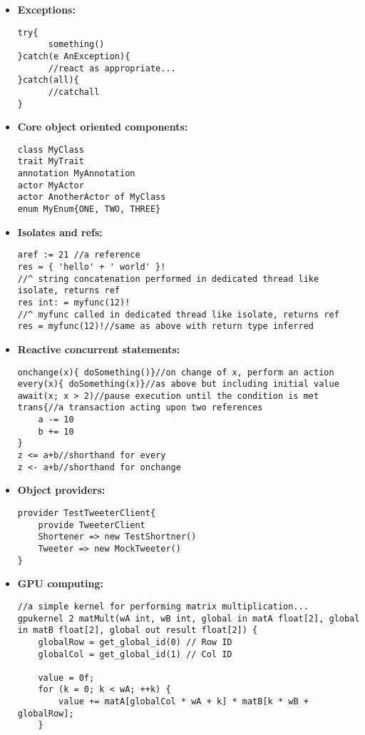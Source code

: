 \documentclass[conc-doc]{subfiles}
\begin{document}
\begin{itemize}
	
	\item \textbf{Exceptions:}
\begin{lstlisting}
try{
	  something()
}catch(e AnException){
	  //react as appropriate...
}catch(all){
	  //catchall
}
\end{lstlisting}

	\item \textbf{Core object oriented components:}
\begin{lstlisting}
class MyClass
trait MyTrait
annotation MyAnnotation
actor MyActor
actor AnotherActor of MyClass
enum MyEnum{ONE, TWO, THREE}
\end{lstlisting}


\item \textbf{Isolates and refs:}
\begin{lstlisting}
aref := 21 //a reference
res = { 'hello' + ' world' }!
//^ string concatenation performed in dedicated thread like isolate, returns ref
res int: = myfunc(12)!
//^ myfunc called in dedicated thread like isolate, returns ref
res = myfunc(12)!//same as above with return type inferred
\end{lstlisting}


	\item \textbf{Reactive concurrent statements:}
	\begin{lstlisting}
onchange(x){ doSomething()}//on change of x, perform an action
every(x){ doSomething(x)}//as above but including initial value
await(x; x > 2)//pause execution until the condition is met
trans{//a transaction acting upon two references
	a -= 10
	b += 10
}
z <= a+b//shorthand for every
z <- a+b//shorthand for onchange
	\end{lstlisting}
	
	\item \textbf{Object providers:}
	\begin{lstlisting}
provider TestTweeterClient{
	provide TweeterClient
	Shortener => new TestShortner()
	Tweeter => new MockTweeter()
}
	\end{lstlisting}
	
	\item \textbf{GPU computing:}
	\begin{lstlisting}
//a simple kernel for performing matrix multiplication...
gpukernel 2 matMult(wA int, wB int, global in matA float[2], global in matB float[2], global out result float[2]) {
	globalRow = get_global_id(0) // Row ID
	globalCol = get_global_id(1) // Col ID
	
	value = 0f;
	for (k = 0; k < wA; ++k) {
		value += matA[globalCol * wA + k] * matB[k * wB + globalRow];
	}
	

\end{lstlisting}
\end{itemize}
\end{document}
